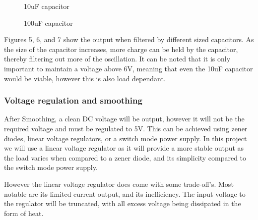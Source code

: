 \documentclass[a4paper,11pt]{article}
\begin{document}
\begin{figure}[!htb]
  \caption{10uF capacitor}
\endminipage\hfill
{}%
  \caption{100uF capacitor}
\endminipage
\end{figure}

Figures 5, 6, and 7 show the output when filtered by different sized capacitors. As the size of the capacitor increases, more charge can be held by the capacitor, thereby filtering out more of the oscillation. It can be noted that it is only important to maintain a voltage above 6V, meaning that even the 10uF capacitor would be viable, however this is also load dependant.

\subsubsection{Voltage regulation and smoothing}

After Smoothing, a clean DC voltage will be output, however it will not be the required voltage and must be regulated to 5V. This can be achieved using zener diodes, linear voltage regulators, or a switch mode power supply. In this project we will use a linear voltage regulator as it will provide a more stable output as the load varies when compared to a zener diode, and its simplicity compared to the switch mode power supply.

However the linear voltage regulator does come with some trade-off's. Most notable are its limited current output, and its inefficiency. The input voltage to the regulator will be truncated, with all excess voltage being dissipated in the form of heat.
\end{document}
